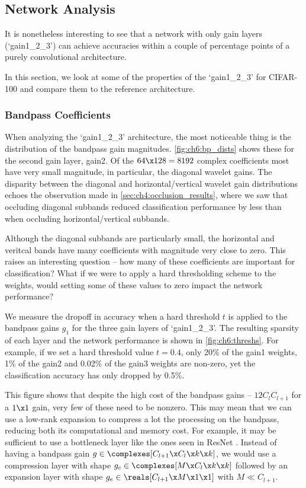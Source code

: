 \subsection{Network Analysis}
It is nonetheless interesting to see that a network with only gain layers
(`gain1\_2\_3') can achieve accuracies within a couple of percentage points of a
purely convolutional architecture.

In this section, we look at some of the properties of the `gain1\_2\_3' for
CIFAR-100 and compare them to the reference architecture.

\subsubsection{Bandpass Coefficients}
When analyzing the `gain1\_2\_3' architecture, the most noticeable thing is the
distribution of the bandpass gain magnitudes. \autoref{fig:ch6:bp_dists} shows
these for the second gain layer, gain2. Of the $64\x 128=8192$ complex
coefficients most have very small magnitude, in particular, the diagonal wavelet
gains. The disparity between the diagonal and horizontal/vertical wavelet gain
distributions echoes the observation made in
\autoref{sec:ch4:occlusion_results}, where we saw that occluding diagonal
subbands reduced classification performance by less than when occluding
horizontal/vertical subbands.

Although the diagonal subbands are particularly small, the horizontal and
veritcal bands have many coefficients with magnitude very close to zero.
This raises an interesting question -- how many of these coefficients are
important for classification? What if we were to apply a hard thresholding
scheme to the weights, would setting some of these values to zero impact the
network performance?

We measure the dropoff in accuracy when a hard threshold $t$ is applied to the
bandpass gains $g_1$ for the three gain layers of `gain1\_2\_3'. The resulting sparsity
of each layer and the network performance is shown in \autoref{fig:ch6:threshs}.
For example, if we set a hard threshold value $t=0.4$, only 20\% of the gain1
weights, 1\% of the gain2 and 0.02\% of the gain3 weights are non-zero, yet the
classification accuracy has only dropped by 0.5\%.

This figure shows that despite the high cost of the bandpass gains --
$12C_{l}C_{l+1}$ for a $1\x1$ gain, very few of these need to be nonzero. This
may mean that we can use a low-rank expansion to compress a lot the processing
on the bandpass, reducing both its computational and memory cost. For example,
it may be sufficient to use a bottleneck layer like the ones seen in ResNet
\cite{he_deep_2016}. Instead of having a bandpass gain 
$g \in \complexes[C_{l+1}\x C_l\x k\x k]$, we would use a compression layer with shape $g_{c} \in \complexes[M\x
C_l\x k\x k]$ followed by an expansion layer with shape $g_e \in \reals[C_{l+1}\x M\x
1\x 1]$ with $M \ll C_{l+1}$.


